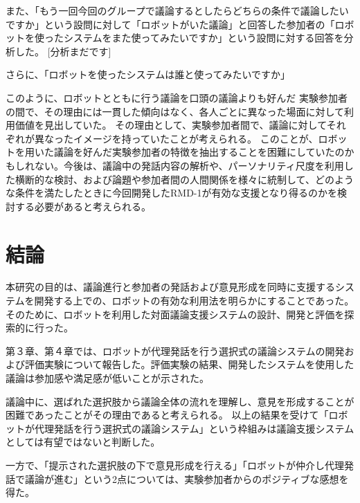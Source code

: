 \documentclass[11pt, a4paper]{jreport} %
\begin{document}
また、「もう一回今回のグループで議論するとしたらどちらの条件で議論したいですか」という設問に対して「ロボットがいた議論」と回答した参加者の「ロボットを使ったシステムをまた使ってみたいですか」という設問に対する回答を分析した。
[分析まだです]


さらに、「ロボットを使ったシステムは誰と使ってみたいですか」

このように、ロボットとともに行う議論を口頭の議論よりも好んだ
実験参加者の間で、その理由には一貫した傾向はなく、各人ごとに異なった場面に対して利用価値を見出していた。
その理由として、実験参加者間で、議論に対してそれぞれが異なったイメージを持っていたことが考えられる。
このことが、ロボットを用いた議論を好んだ実験参加者の特徴を抽出することを困難にしていたのかもしれない。今後は、議論中の発話内容の解析や、パーソナリティ尺度を利用した横断的な検討、および論題や参加者間の人間関係を様々に統制して、どのような条件を満たしたときに今回開発したRMD-1が有効な支援となり得るのかを検討する必要があると考えられる。









%


\chapter{結論}
本研究の目的は、議論進行と参加者の発話および意見形成を同時に支援するシステムを開発する上での、ロボットの有効な利用法を明らかにすることであった。そのために、ロボットを利用した対面議論支援システムの設計、開発と評価を探索的に行った。


第３章、第４章では、ロボットが代理発話を行う選択式の議論システムの開発および評価実験について報告した。評価実験の結果、開発したシステムを使用した議論は参加感や満足感が低いことが示された。

議論中に、選ばれた選択肢から議論全体の流れを理解し、意見を形成することが困難であったことがその理由であると考えられる。
以上の結果を受けて「ロボットが代理発話を行う選択式の議論システム」という枠組みは議論支援システムとしては有望ではないと判断した。

一方で、「提示された選択肢の下で意見形成を行える」「ロボットが仲介し代理発話で議論が進む」という2点については、実験参加者からのポジティブな感想を得た。
\end{document}
